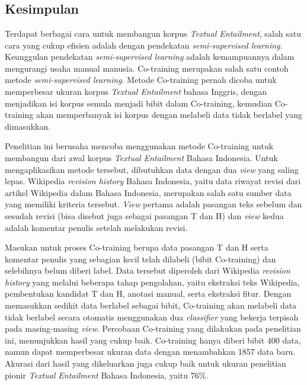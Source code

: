 \chapter{\babEnam}

\section{Kesimpulan}

Terdapat berbagai cara untuk membangun korpus \textit{Textual Entailment}, salah satu cara yang cukup efisien adalah dengan pendekatan \textit{semi-supervised learning}. Keunggulan pendekatan \textit{semi-supervised learning} adalah kemampuannya dalam mengurangi usaha manual manusia. Co-training merupakan salah satu contoh metode \textit{semi-supervised learning}. Metode Co-training pernah dicoba untuk  memperbesar ukuran korpus \textit{Textual Entailment} bahasa Inggris, dengan menjadikan isi korpus semula menjadi bibit dalam Co-training, kemudian Co-training akan memperbanyak isi korpus dengan melabeli data tidak berlabel yang dimasukkan. 

Penelitian ini berusaha mencoba menggunakan metode Co-training untuk membangun dari awal korpus \textit{Textual Entailment} Bahasa Indonesia. Untuk mengaplikasikan metode tersebut, dibutuhkan data dengan dua \textit{view} yang saling lepas. Wikipedia \textit{revision history} Bahasa Indonesia, yaitu data riwayat revisi dari artikel Wikipedia dalam Bahasa Indonesia, merupakan salah satu sumber data yang memiliki kriteria tersebut. \textit{View} pertama adalah pasangan teks sebelum dan sesudah revisi (bisa disebut juga sebagai pasangan T dan H) dan \textit{view} kedua adalah komentar penulis setelah melakukan revisi. 

Masukan untuk proses Co-training berupa data pasangan T dan H serta komentar penulis yang sebagian kecil telah dilabeli (bibit Co-training) dan selebihnya belum diberi label. Data tersebut diperoleh dari Wikipedia \textit{revision history} yang melalui beberapa tahap pengolahan, yaitu ekstraksi teks Wikipedia, pembentukan kandidat T dan H, anotasi manual, serta ekstraksi fitur. Dengan memasukkan sedikit data berlabel sebagai bibit, Co-training akan melabeli data tidak berlabel secara otomatis menggunakan dua \textit{classifier} yang bekerja terpisah pada masing-masing \textit{view}. Percobaan Co-training yang dilakukan pada penelitian ini, menunjukkan hasil yang cukup baik. Co-training hanya diberi bibit 400 data, namun dapat memperbesar ukuran data dengan menambahkan 1857 data baru. Akurasi dari hasil yang dikeluarkan juga cukup baik untuk ukuran penelitian pionir \textit{Textual Entailment} Bahasa Indonesia, yaitu 76\%. 

